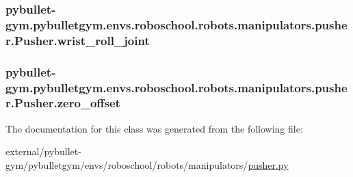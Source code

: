 \subsubsection[{\texorpdfstring{wrist\+\_\+roll\+\_\+joint}{wrist_roll_joint}}]{\setlength{\rightskip}{0pt plus 5cm}pybullet-\/gym.\+pybulletgym.\+envs.\+roboschool.\+robots.\+manipulators.\+pusher.\+Pusher.\+wrist\+\_\+roll\+\_\+joint}\hypertarget{classpybullet-gym_1_1pybulletgym_1_1envs_1_1roboschool_1_1robots_1_1manipulators_1_1pusher_1_1_pusher_a17c32641080707942d9bf86f29bc61fc}{}\label{classpybullet-gym_1_1pybulletgym_1_1envs_1_1roboschool_1_1robots_1_1manipulators_1_1pusher_1_1_pusher_a17c32641080707942d9bf86f29bc61fc}
\subsubsection[{\texorpdfstring{zero\+\_\+offset}{zero_offset}}]{\setlength{\rightskip}{0pt plus 5cm}pybullet-\/gym.\+pybulletgym.\+envs.\+roboschool.\+robots.\+manipulators.\+pusher.\+Pusher.\+zero\+\_\+offset}\hypertarget{classpybullet-gym_1_1pybulletgym_1_1envs_1_1roboschool_1_1robots_1_1manipulators_1_1pusher_1_1_pusher_ae037df4c3486c4df6c652575b97f8e46}{}\label{classpybullet-gym_1_1pybulletgym_1_1envs_1_1roboschool_1_1robots_1_1manipulators_1_1pusher_1_1_pusher_ae037df4c3486c4df6c652575b97f8e46}


The documentation for this class was generated from the following file\+:\begin{DoxyCompactItemize}
\item 
external/pybullet-\/gym/pybulletgym/envs/roboschool/robots/manipulators/\hyperlink{roboschool_2robots_2manipulators_2pusher_8py}{pusher.\+py}\end{DoxyCompactItemize}
